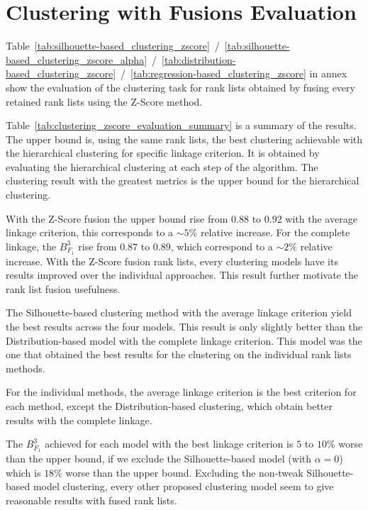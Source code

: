 \section{Clustering with Fusions Evaluation}

Table~\ref{tab:silhouette-based_clustering_zscore}~/~\ref{tab:silhouette-based_clustering_zscore_alpha}~/~\ref{tab:distribution-based_clustering_zscore}~/~\ref{tab:regression-based_clustering_zscore} in annex show the evaluation of the clustering task for rank lists obtained by fusing every retained rank lists using the Z-Score method.

Table~\ref{tab:clustering_zscore_evaluation_summary} is a summary of the results.
The upper bound is, using the same rank lists, the best clustering achievable with the hierarchical clustering for specific linkage criterion.
It is obtained by evaluating the hierarchical clustering at each step of the algorithm.
The clustering result with the greatest metrics is the upper bound for the hierarchical clustering.

With the Z-Score fusion the upper bound rise from $0.88$ to $0.92$ with the average linkage criterion, this corresponds to a $\sim 5\%$ relative increase.
For the complete linkage, the $B^{3}_{F_1}$ rise from $0.87$ to $0.89$, which correspond to a $\sim 2\%$ relative increase.
With the Z-Score fusion rank lists, every clustering models have its results improved over the individual approaches.
This result further motivate the rank list fusion usefulness.

The Silhouette-based clustering method with the average linkage criterion yield the best results across the four models.
This result is only slightly better than the Distribution-based model with the complete linkage criterion.
This model was the one that obtained the best results for the clustering on the individual rank lists methods.

For the individual methods, the average linkage criterion is the best criterion for each method, except the Distribution-based clustering, which obtain better results with the complete linkage.

The $B^{3}_{F_1}$ achieved for each model with the best linkage criterion is $5$ to $10\%$ worse than the upper bound, if we exclude the Silhouette-based model (with $\alpha = 0$) which is $18\%$ worse than the upper bound.
Excluding the non-tweak Silhouette-based model clustering, every other proposed clustering model seem to give reasonable results with fused rank lists.

